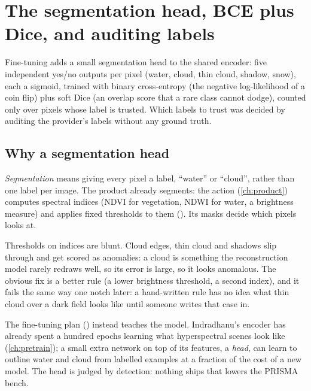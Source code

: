 \chapter{The segmentation head, BCE plus Dice, and auditing labels}\label{ch:seghead}
\begingroup\setlength{\emergencystretch}{5em}%
\def\tbrk{\hfil\penalty50\hfilneg}%

\begin{onething}
Fine-tuning adds a small segmentation head to the shared encoder: five independent yes/no outputs per pixel (water,
cloud, thin cloud, shadow, snow), each a sigmoid, trained with binary cross-entropy (the negative log-likelihood of a
coin flip) plus soft Dice (an overlap score that a rare class cannot dodge), counted only over pixels whose label is
trusted. Which labels to trust was decided by auditing the provider's labels without any ground truth.
\end{onething}

\section{Why a segmentation head}\label{sec:seghead:why}

\emph{Segmentation} means giving every pixel a label, ``water'' or ``cloud'', rather than one label per
image. The product already segments: the  action (\cref{ch:product}) computes spectral indices
(NDVI for vegetation, NDWI for water, a brightness measure) and applies fixed thresholds to them
(). Its masks decide which pixels  looks at.

Thresholds on indices are blunt. Cloud edges, thin cloud and shadows slip through and get scored as anomalies: a cloud is
something the reconstruction model rarely redraws well, so its error is large, so it looks anomalous. The obvious fix is a
better rule (a lower brightness threshold, a second index), and it fails the same way one notch later: a hand-written rule has
no idea what thin cloud over a dark field looks like until someone writes that case in.

The fine-tuning plan () instead teaches the model. Indradhanu's encoder
has already spent a hundred epochs learning what hyperspectral scenes look like (\cref{ch:pretrain}); a small extra network on
top of its features, a \emph{head}, can learn to outline water and cloud from labelled examples at a fraction
of the cost of a new model. The head is judged by detection: nothing ships that lowers the PRISMA bench.

